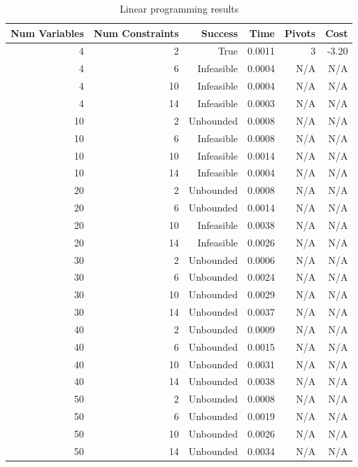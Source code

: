 \begin{table}[ht]
    \centering
    \begin{tabular}{rrrrrr}
        \toprule
        Num Variables & Num Constraints & Success & Time & Pivots & Cost \\
        \midrule
        4 & 2 & True & 0.0011 & 3 & -3.20 \\
		4 & 6 & Infeasible & 0.0004 & N/A & N/A \\
		4 & 10 & Infeasible & 0.0004 & N/A & N/A \\
		4 & 14 & Infeasible & 0.0003 & N/A & N/A \\
		10 & 2 & Unbounded & 0.0008 & N/A & N/A \\
		10 & 6 & Infeasible & 0.0008 & N/A & N/A \\
		10 & 10 & Infeasible & 0.0014 & N/A & N/A \\
		10 & 14 & Infeasible & 0.0004 & N/A & N/A \\
		20 & 2 & Unbounded & 0.0008 & N/A & N/A \\
		20 & 6 & Unbounded & 0.0014 & N/A & N/A \\
		20 & 10 & Infeasible & 0.0038 & N/A & N/A \\
		20 & 14 & Infeasible & 0.0026 & N/A & N/A \\
		30 & 2 & Unbounded & 0.0006 & N/A & N/A \\
		30 & 6 & Unbounded & 0.0024 & N/A & N/A \\
		30 & 10 & Unbounded & 0.0029 & N/A & N/A \\
		30 & 14 & Unbounded & 0.0037 & N/A & N/A \\
		40 & 2 & Unbounded & 0.0009 & N/A & N/A \\
		40 & 6 & Unbounded & 0.0015 & N/A & N/A \\
		40 & 10 & Unbounded & 0.0031 & N/A & N/A \\
		40 & 14 & Unbounded & 0.0038 & N/A & N/A \\
		50 & 2 & Unbounded & 0.0008 & N/A & N/A \\
		50 & 6 & Unbounded & 0.0019 & N/A & N/A \\
		50 & 10 & Unbounded & 0.0026 & N/A & N/A \\
		50 & 14 & Unbounded & 0.0034 & N/A & N/A \\
        \bottomrule
    \end{tabular}
    \caption{Linear programming results}
    \label{tab:lp-results}
\end{table}